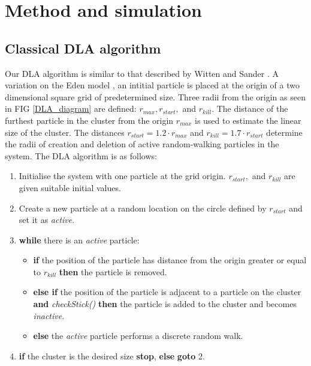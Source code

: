 \documentclass[10pt, twocolumn]{article} %
\begin{document}
\section*{Method and simulation}

\subsection*{Classical DLA algorithm}
  Our DLA algorithm is similar to that described by Witten and Sander \cite{Witten_1981}. A variation on the Eden model \cite{Eden_1961}, an intitial particle is placed at the origin of a two dimensional square grid of predetermined size. Three radii from the origin as seen in FIG \ref{DLA_diagram} are defined: $r_{max}, r_{start},$ and $r_{kill}$. The distance of the furthest particle in the cluster from the origin $r_{max}$ is used to estimate the linear size of the cluster. The distances $r_{start} = 1.2 \cdot r_{max}$ and $r_{kill} = 1.7 \cdot r_{start}$ determine the radii of creation and deletion of active random-walking particles in the system. The DLA algorithm is as follows:

  \begin{enumerate}
    \item Initialise the system with one particle at the grid origin. $r_{start},$ and $r_{kill}$ are given suitable initial values.
    \item Create a new particle at a random location on the circle defined by $r_{start}$ and set it as \textit{active}.
    \item \textbf{while} there is an \textit{active} particle:
    \begin{itemize}
      \item \textbf{if} the position of the particle has distance from the origin greater or equal to $r_{kill}$ \textbf{then} the particle is removed.
      \item \textbf{else if} the position of the particle is adjacent to a particle on the cluster \textbf{and} \textit{checkStick()} \textbf{then} the particle is added to the cluster and becomes \textit{inactive}.
      \item \textbf{else} the \textit{active} particle performs a discrete random walk.
    \end {itemize}
  \item \textbf{if} the cluster is the desired size \textbf{stop}, \textbf{else} \textbf{goto} 2.
  \end{enumerate}
\end{document}
